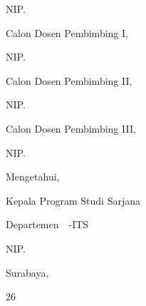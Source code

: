 \begin{center}
{{\begin{minipage}{\twocolumns}
                        \vspace{2cm}
                        \underline{\pbb@dua}
                        
                        NIP. \NIP@pbb@dua
                    \end{minipage}
                }
        }
        {
            \newlength{\threecolumns}
            \setlength{\threecolumns}{.3\textwidth}
            \begin{minipage}{\threecolumns}
                \centering
                Calon Dosen Pembimbing I,

                \vspace{2cm}
                \underline{\pbb@satu}
                
                NIP. \NIP@pbb@satu
            \end{minipage}
            \begin{minipage}{\threecolumns}
                \centering
                Calon Dosen Pembimbing II,

                \vspace{2cm}
                \underline{\pbb@dua}
                
                NIP. \NIP@pbb@dua
            \end{minipage}
            \begin{minipage}{\threecolumns}
                \centering
                Calon Dosen Pembimbing III,

                \vspace{2cm}
                \underline{\pbb@tiga}
                
                NIP. \NIP@pbb@tiga
            \end{minipage}
        }

    \vspace{0.5cm}
    Mengetahui,

    Kepala Program Studi Sarjana
    
    Departemen~\@departemen~{\singkatan@fakultas}-ITS

    \vspace{2cm}
    \underline{\@Kaprodi}
    
    
    NIP.\NIP@Kaprodi

    \vspace{0.5cm}
    Surabaya,

    {26 \@bulan~}\@tahun
\end{center}
\makeatother